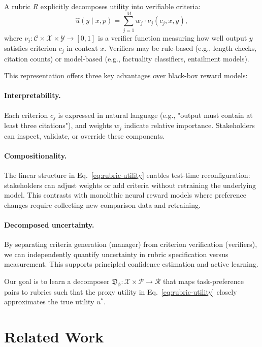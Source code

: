 \documentclass[sigconf]{acmart}
\begin{document}
A rubric \(R\) explicitly decomposes utility into verifiable criteria:
\begin{equation}
\hat{u}(y \mid x, p) = \sum_{j=1}^M w_j \cdot \nu_j(c_j, x, y),
\label{eq:rubric-utility}
\end{equation}
where \(\nu_j: \mathcal{C} \times \mathcal{X} \times \mathcal{Y} \to [0,1]\) is a verifier function measuring how well output \(y\) satisfies criterion \(c_j\) in context \(x\). Verifiers may be rule-based (e.g., length checks, citation counts) or model-based (e.g., factuality classifiers, entailment models).

This representation offers three key advantages over black-box reward models:

\paragraph{Interpretability.} Each criterion \(c_j\) is expressed in natural language (e.g., "output must contain at least three citations"), and weights \(w_j\) indicate relative importance. Stakeholders can inspect, validate, or override these components.

\paragraph{Compositionality.} The linear structure in Eq.~\ref{eq:rubric-utility} enables test-time reconfiguration: stakeholders can adjust weights or add criteria without retraining the underlying model. This contrasts with monolithic neural reward models where preference changes require collecting new comparison data and retraining.

\paragraph{Decomposed uncertainty.} By separating criteria generation (manager) from criterion verification (verifiers), we can independently quantify uncertainty in rubric specification versus measurement. This supports principled confidence estimation and active learning.

Our goal is to learn a decomposer \(\mathfrak{D}_\phi: \mathcal{X} \times \mathcal{P} \to \mathcal{R}\) that maps task-preference pairs to rubrics such that the proxy utility in Eq.~\ref{eq:rubric-utility} closely approximates the true utility \(u^*\).


\section{Related Work}
\end{document}
